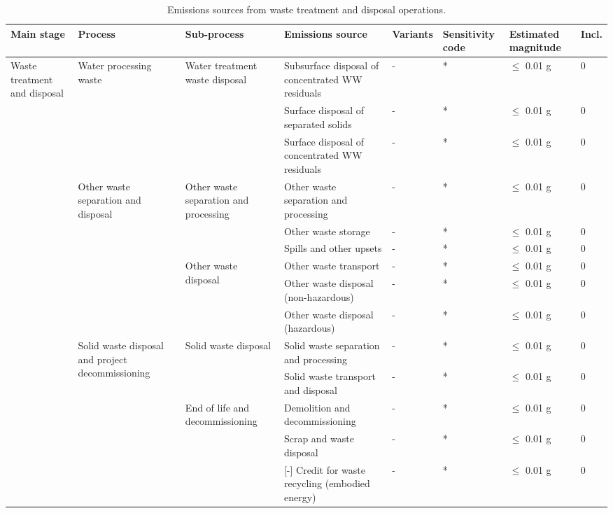 \documentclass[11pt]{report}
\begin{document}
\begin{landscape}
\begin{table}
\begin{scriptsize}
\caption{Emissions sources from waste treatment and disposal operations.}
\label{tab:waste_sources}
\begin{tabular}{|p{}|p{}|p{}|p{}|p{}|p{}|p{}|p{}|}
\hline
\textbf{Main stage} & \textbf{Process} & \textbf{Sub-process} & \textbf{Emissions source} & \textbf{Variants}& \textbf{Sensitivity code} & \textbf{Estimated magnitude} & \textbf{Incl.}\\
\hline
\multirow{14}{0.08\columnwidth}{Waste treatment and disposal} & \multirow{3}{0.09\columnwidth}{Water processing waste} & \multirow{3}{0.12\columnwidth}{Water treatment waste disposal} & Subsurface disposal of concentrated WW residuals & - & * & $\leq$ 0.01 g & 0\\
\cline{4-8}
& & & Surface disposal of separated solids & - & * & $\leq$ 0.01 g & 0\\
\cline{4-8}
& & & Surface disposal of concentrated WW residuals & - & * & $\leq$ 0.01 g & 0\\
\cline{2-8}
& \multirow{6}{0.09\columnwidth}{Other waste separation and disposal} & \multirow{3}{0.12\columnwidth}{Other waste separation and processing} & Other waste separation and processing & - & * & $\leq$ 0.01 g & 0\\
\cline{4-8}
& & & Other waste storage & - & * & $\leq$ 0.01 g & 0\\
\cline{4-8}
& & & Spills and other upsets & - & * & $\leq$ 0.01 g & 0\\
\cline{3-8}
& & \multirow{3}{0.09\columnwidth}{Other waste disposal} & Other waste transport & - & * & $\leq$ 0.01 g & 0\\
\cline{4-8}
& & & Other waste disposal (non-hazardous) & - & * & $\leq$ 0.01 g & 0\\
\cline{4-8}
& & & Other waste disposal (hazardous) & - & * & $\leq$ 0.01 g & 0\\
\cline{2-8}
& \multirow{5}{0.09\columnwidth}{Solid waste disposal and project decommissioning} & \multirow{2}{0.12\columnwidth}{Solid waste disposal} & Solid waste separation and processing & - & * & $\leq$ 0.01 g & 0\\
\cline{4-8}
& & & Solid waste transport and disposal & - & * & $\leq$ 0.01 g & 0\\
\cline{3-8}
& & \multirow{3}{0.09\columnwidth}{End of life and decommissioning} & Demolition and decommissioning & - & * & $\leq$ 0.01 g & 0\\
\cline{4-8}
& & & Scrap and waste disposal & - & * & $\leq$ 0.01 g & 0\\
\cline{4-8}
& & & [-] Credit for waste recycling (embodied energy) & - & * & $\leq$ 0.01 g & 0\\
\hline
\end{tabular}
\end{scriptsize}
\end{table}



\end{landscape}
\end{document}
